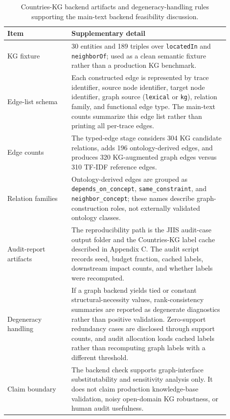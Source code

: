 \documentclass[pdflatex,sn-mathphys-num]{sn-jnl}
\begin{document}
\begin{table}[ht]
\caption{Countries-KG backend artifacts and degeneracy-handling rules supporting the main-text backend feasibility discussion.}
\label{tab:supp-kg-backend-artifacts}
\centering
\scriptsize
\renewcommand{\arraystretch}{1.08}
\begin{tabular}{Z{0.26\linewidth}Z{0.64\linewidth}}
\toprule
\textbf{Item} & \textbf{Supplementary detail} \\
\midrule
KG fixture & 30 entities and 189 triples over \texttt{locatedIn} and \texttt{neighborOf}; used as a clean semantic fixture rather than a production KG benchmark. \\
Edge-list schema & Each constructed edge is represented by trace identifier, source node identifier, target node identifier, graph source (\texttt{lexical} or \texttt{kg}), relation family, and functional edge type. The main-text counts summarize this edge list rather than printing all per-trace edges. \\
Edge counts & The typed-edge stage considers 304 KG candidate relations, adds 196 ontology-derived edges, and produces 320 KG-augmented graph edges versus 310 TF-IDF reference edges. \\
Relation families & Ontology-derived edges are grouped as \texttt{depends\_on\_concept}, \texttt{same\_constraint}, and \texttt{neighbor\_concept}; these names describe graph-construction roles, not externally validated ontology classes. \\
Audit-report artifacts & The reproducibility path is the JIIS audit-case output folder and the Countries-KG label cache described in Appendix C. The audit script records seed, budget fraction, cached labels, downstream impact counts, and whether labels were recomputed. \\
Degeneracy handling & If a graph backend yields tied or constant structural-necessity values, rank-consistency summaries are reported as degenerate diagnostics rather than positive validation. Zero-support redundancy cases are disclosed through support counts, and audit allocation loads cached labels rather than recomputing graph labels with a different threshold. \\
Claim boundary & The backend check supports graph-interface substitutability and sensitivity analysis only. It does not claim production knowledge-base validation, noisy open-domain KG robustness, or human audit usefulness. \\
\bottomrule
\end{tabular}
\end{table}
\end{document}

